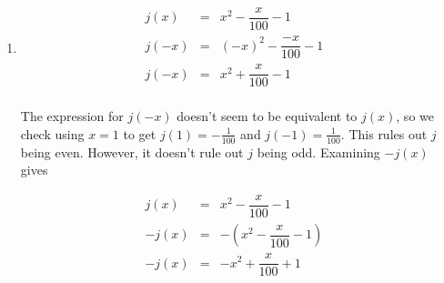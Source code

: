 {\begin{enumerate}
\setlength{\extrarowheight}{8pt}

 \[ \begin{array}{rclr}   

i(x) & = & \dfrac{5x}{2x - x^3} & \\ 
& = & \dfrac{(-1) 5x}{(-1)\left(2x - x^3\right)} & \\ 
& = & \dfrac{-5x}{-2x + x^3} & \\  

\end{array} \]

\setlength{\extrarowheight}{2pt}

Hence, $i(x) = i(-x)$, so $i$ is even. See Figure \ref{fig:evenodd4} for the graph.


\setlength{\extrarowheight}{8pt}

\item  \[ \begin{array}{rclr}   

j(x) & = & x^2 - \dfrac{x}{100} - 1 & \\ 
j(-x) & = & (-x)^2 - \dfrac{-x}{100} - 1 & \\   
j(-x) & = & x^2 + \dfrac{x}{100} - 1 & \\   

\end{array} \]

\setlength{\extrarowheight}{2pt}

The expression for $j(-x)$ doesn't seem to be equivalent to $j(x)$, so we check using $x = 1$ to get $j(1) = -\frac{1}{100}$ and $j(-1) = \frac{1}{100}$.  This rules out $j$ being even.  However, it doesn't rule out $j$ being odd.  Examining $-j(x)$ gives

\setlength{\extrarowheight}{8pt}

 \[ \begin{array}{rclr}   

j(x) & = & x^2 - \dfrac{x}{100} - 1 & \\ 
-j(x) & = & -\left(x^2 - \dfrac{x}{100} - 1\right) & \\   
-j(x) & = & -x^2 + \dfrac{x}{100} + 1 & \\   

\end{array} \]

\setlength{\extrarowheight}{2pt}


\end{enumerate}}

